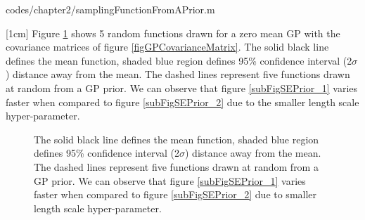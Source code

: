 \begin{mdframed}[hidealllines=true,backgroundcolor=lightgray!20]

                    {codes/chapter2/samplingFunctionFromAPrior.m}
\end{mdframed}

[1cm]
Figure \ref{figGPPriors} shows 5 random functions drawn for a zero mean GP with the covariance matrices of figure \ref{figGPCovarianceMatrix}. The solid black line defines the mean function, shaded blue region defines 95\% confidence interval (2$\sigma$) distance away from the mean. The dashed lines represent five functions drawn at random from a GP prior. We can observe that figure \ref{subFigSEPrior_1} varies faster when compared to figure \ref{subFigSEPrior_2} due to the smaller length scale hyper-parameter. 

\begin{figure}[!ht]
  \centering
    \quad
{}\quad
  
       \caption{The solid black line defines the mean function, shaded blue region defines 95\% confidence interval (2$\sigma$) distance away from the mean. The dashed lines represent five functions drawn at random from a GP prior. We can observe that figure \ref{subFigSEPrior_1} varies faster when compared to figure \ref{subFigSEPrior_2} due to smaller length scale hyper-parameter.       }\label{figGPPriors}
\end{figure}



